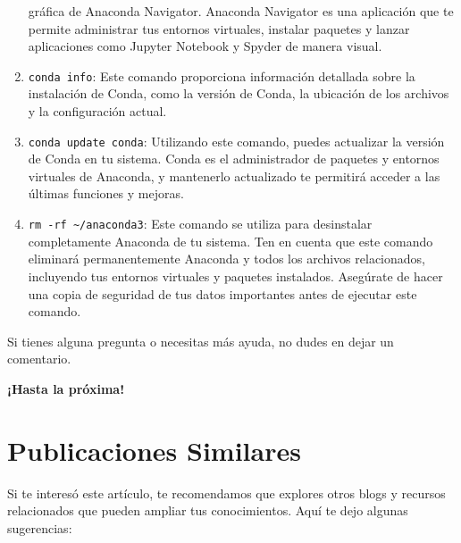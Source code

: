 \documentclass[
  jou,
  floatsintext,
  longtable,
  a4paper,
  nolmodern,
  notxfonts,
  notimes,
  colorlinks=true,linkcolor=blue,citecolor=blue,urlcolor=blue]{apa7}
\begin{document}
\begin{enumerate}
  gráfica de Anaconda Navigator. Anaconda Navigator es una aplicación
  que te permite administrar tus entornos virtuales, instalar paquetes y
  lanzar aplicaciones como Jupyter Notebook y Spyder de manera visual.
\item
  \texttt{conda\ info}: Este comando proporciona información detallada
  sobre la instalación de Conda, como la versión de Conda, la ubicación
  de los archivos y la configuración actual.
\item
  \texttt{conda\ update\ conda}: Utilizando este comando, puedes
  actualizar la versión de Conda en tu sistema. Conda es el
  administrador de paquetes y entornos virtuales de Anaconda, y
  mantenerlo actualizado te permitirá acceder a las últimas funciones y
  mejoras.
\item
  \texttt{rm\ -rf\ \textasciitilde{}/anaconda3}: Este comando se utiliza
  para desinstalar completamente Anaconda de tu sistema. Ten en cuenta
  que este comando eliminará permanentemente Anaconda y todos los
  archivos relacionados, incluyendo tus entornos virtuales y paquetes
  instalados. Asegúrate de hacer una copia de seguridad de tus datos
  importantes antes de ejecutar este comando.
\end{enumerate}

Si tienes alguna pregunta o necesitas más ayuda, no dudes en dejar un
comentario.

\textbf{¡Hasta la próxima!}

\section{Publicaciones Similares}\label{publicaciones-similares}

Si te interesó este artículo, te recomendamos que explores otros blogs y
recursos relacionados que pueden ampliar tus conocimientos. Aquí te dejo
algunas sugerencias:
\end{document}
